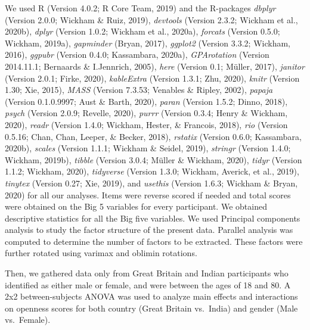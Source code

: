 \documentclass[
  english,
  man]{apa6}
\begin{document}
We used R (Version 4.0.2; R Core Team, 2019) and the R-packages \emph{dbplyr} (Version 2.0.0; Wickham \& Ruiz, 2019), \emph{devtools} (Version 2.3.2; Wickham et al., 2020b), \emph{dplyr} (Version 1.0.2; Wickham et al., 2020a), \emph{forcats} (Version 0.5.0; Wickham, 2019a), \emph{gapminder} (Bryan, 2017), \emph{ggplot2} (Version 3.3.2; Wickham, 2016), \emph{ggpubr} (Version 0.4.0; Kassambara, 2020a), \emph{GPArotation} (Version 2014.11.1; Bernaards \& I.Jennrich, 2005), \emph{here} (Version 0.1; Müller, 2017), \emph{janitor} (Version 2.0.1; Firke, 2020), \emph{kableExtra} (Version 1.3.1; Zhu, 2020), \emph{knitr} (Version 1.30; Xie, 2015), \emph{MASS} (Version 7.3.53; Venables \& Ripley, 2002), \emph{papaja} (Version 0.1.0.9997; Aust \& Barth, 2020), \emph{paran} (Version 1.5.2; Dinno, 2018), \emph{psych} (Version 2.0.9; Revelle, 2020), \emph{purrr} (Version 0.3.4; Henry \& Wickham, 2020), \emph{readr} (Version 1.4.0; Wickham, Hester, \& Francois, 2018), \emph{rio} (Version 0.5.16; Chan, Chan, Leeper, \& Becker, 2018), \emph{rstatix} (Version 0.6.0; Kassambara, 2020b), \emph{scales} (Version 1.1.1; Wickham \& Seidel, 2019), \emph{stringr} (Version 1.4.0; Wickham, 2019b), \emph{tibble} (Version 3.0.4; Müller \& Wickham, 2020), \emph{tidyr} (Version 1.1.2; Wickham, 2020), \emph{tidyverse} (Version 1.3.0; Wickham, Averick, et al., 2019), \emph{tinytex} (Version 0.27; Xie, 2019), and \emph{usethis} (Version 1.6.3; Wickham \& Bryan, 2020) for all our analyses. Items were reverse scored if needed and total scores were obtained on the Big 5 variables for every participant. We obtained descriptive statistics for all the Big five variables. We used Principal components analysis to study the factor structure of the present data. Parallel analysis was computed to determine the number of factors to be extracted. These factors were further rotated using varimax and oblimin rotations.

Then, we gathered data only from Great Britain and Indian participants who identified as either male or female, and were between the ages of 18 and 80. A 2x2 between-subjects ANOVA was used to analyze main effects and interactions on openness scores for both country (Great Britain vs.~India) and gender (Male vs.~Female).
\end{document}

